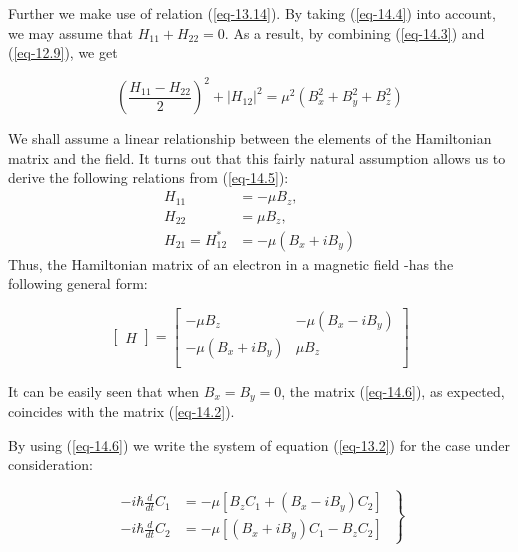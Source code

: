 \documentclass[a4paper,sfsidenotes,colorlinks=true]{tufte-book}
\numberwithin{equation}{section}
\numberwithin{figure}{section}
\begin{document}
Further we make use of relation (\ref{eq-13.14}). By taking
(\ref{eq-14.4}) into account, we may assume that $H_{11} + H_{22} = 0$. As a result, by combining (\ref{eq-14.3}) and (\ref{eq-12.9}), we get

\begin{equation}%
\left( \frac{H_{11} - H_{22}}{2}  \right)^{2} + |H_{12}|^{2} = \mu^{2}
\left( B_{x}^{2}+ B_{y}^{2} + B_{z}^{2} \right)
\label{eq-14.5}
\end{equation}


We shall assume a linear relationship between the elements of the
Hamiltonian matrix and the field. It turns out that this fairly
natural assumption allows us to derive the following relations from
(\ref{eq-14.5}): 
\begin{equation*}
\begin{split}
H_{11} & = - \mu B_{z},\\
H_{22} & = \mu B_{z},\\
H_{21} = H_{12}^{*} & = - \mu (B_{x} + iB_{y})
\end{split}
\end{equation*}
Thus, the Hamiltonian matrix of an electron in a magnetic field -has
the following general form:

\begin{equation}%
\begin{bmatrix}
H
\end{bmatrix}
=
\begin{bmatrix}
- \mu B_{z} & - \mu (B_{x} - iB_{y}) \\
- \mu (B_{x} + iB_{y})  & \mu B_{z} \\
\end{bmatrix}
\label{eq-14.6}
\end{equation}

It can be easily seen that when $B_{x} = B_{y} = 0$, the matrix (\ref{eq-14.6}), as
expected, coincides with the matrix (\ref{eq-14.2}). 

By using (\ref{eq-14.6}) we write the system of equation (\ref{eq-13.2}) for the case under consideration:

\begin{equation}%
\left.
\begin{split}
-i \hbar \frac{d}{dt} C_{1} & = - \mu \left[ B_{z} C_{1} + (B_{x} -
  iB_{y}) C_{2} \right] \\   
-i \hbar \frac{d}{dt} C_{2} & = - \mu \left[  (B_{x} +
  iB_{y}) C_{1} - B_{z} C_{2} \right]
\end{split}
\; \right\}
\label{eq-14.7}
\end{equation}
\end{document}

